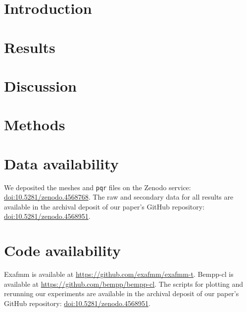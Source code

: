 \documentclass[twocolumn]{article}
\begin{document}

\section{Introduction}\label{sec:intro}


\section{Results}\label{sec:results}


\section{Discussion} \label{sec:discussion}


\small{
\section{Methods}\label{sec:methods}



}

\section{Data availability}
We deposited the meshes and \texttt{pqr} files on the Zenodo service: \href{http://doi.org/10.5281/zenodo.4568768}{doi:10.5281/zenodo.4568768}.
The raw and secondary data for all results are available in the archival deposit of our paper’s GitHub repository: \href{http://doi.org/10.5281/zenodo.4568951}{doi:10.5281/zenodo.4568951}.

\section{Code availability}
Exafmm is available at \href{https://github.com/exafmm/exafmm-t}{https://github.com/exafmm/exafmm-t}.
Bempp-cl is available at \href{https://github.com/bempp/bempp-cl}{https://github.com/bempp/bempp-cl}.
The scripts for plotting and rerunning our experiments are available in the archival deposit of our paper’s GitHub repository: \href{http://doi.org/10.5281/zenodo.4568951}{doi:10.5281/zenodo.4568951}.
\end{document}

